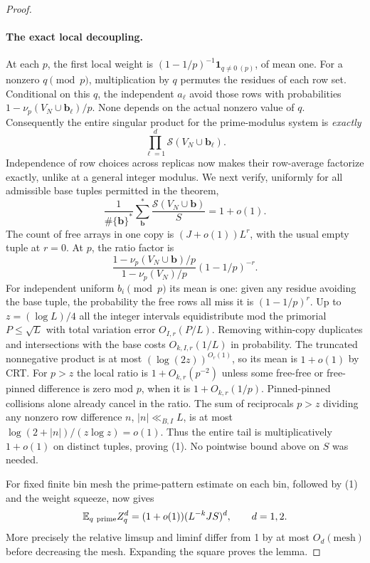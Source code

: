 \documentclass[11pt]{article}
\newcommand{\E}{\mathbb E}
\newcommand{\1}{\mathbf{1}}
\newcommand{\Sg}{\mathcal S}
\begin{document}
\begin{proof}
\paragraph{The exact local decoupling.}
At each $p$, the first local weight is $(1-1/p)^{-1}\1_{q\ne0\ (p)}$, of mean one. For a nonzero $q\pmod p$, multiplication by $q$ permutes the residues of each row set. Conditional on this $q$, the independent $a_\ell$ avoid those rows with probabilities $1-\nu_p(V_N\cup\mathbf b_\ell)/p$. None depends on the actual nonzero value of $q$. Consequently the entire singular product for the prime-modulus system is \emph{exactly}
\[
 \prod_{\ell=1}^d \Sg(V_N\cup\mathbf b_\ell).
\]
Independence of row choices across replicas now makes their row-average factorize exactly, unlike at a general integer modulus. We next verify, uniformly for all admissible base tuples permitted in the theorem,
\[
 \frac{1}{\#\{\mathbf b\}^{*}}\sum_{\mathbf b}^{*}
       \frac{\Sg(V_N\cup\mathbf b)}{S}=1+o(1).\tag{1}
\]
The count of free arrays in one copy is $(J+o(1))L^r$, with the usual empty tuple at $r=0$. At $p$, the ratio factor is
\[
 \frac{1-\nu_p(V_N\cup\mathbf b)/p}{1-\nu_p(V_N)/p}(1-1/p)^{-r}.
\]
For independent uniform $b_i\pmod p$ its mean is one: given any residue avoiding the base tuple, the probability the free rows all miss it is $(1-1/p)^r$. Up to $z=(\log L)/4$ all the integer intervals equidistribute mod the primorial $P\le\sqrt L$ with total variation error $O_{I,r}(P/L)$. Removing within-copy duplicates and intersections with the base costs $O_{k,I,r}(1/L)$ in probability. The truncated nonnegative product is at most $(\log(2z))^{O_r(1)}$, so its mean is $1+o(1)$ by CRT. For $p>z$ the local ratio is $1+O_{k,r}(p^{-2})$ unless some free-free or free-pinned difference is zero mod $p$, when it is $1+O_{k,r}(1/p)$. Pinned-pinned collisions alone already cancel in the ratio. The sum of reciprocals $p>z$ dividing any nonzero row difference $n$, $|n|\ll_{B,I} L$, is at most $\log(2+|n|)/(z\log z)=o(1)$. Thus the entire tail is multiplicatively $1+o(1)$ on distinct tuples, proving (1). No pointwise bound above on $S$ was needed.
\par For fixed finite bin mesh the prime-pattern estimate on each bin, followed by (1) and the weight squeeze, now gives
\[
 \E_{q\ {\rm prime}} Z_q^d=(1+o(1))(L^{-k}J S)^d,
 \qquad d=1,2 .
\]
More precisely the relative limsup and liminf differ from 1 by at most $O_d(\text{mesh})$ before decreasing the mesh. Expanding the square proves the lemma.
\end{proof}
\end{document}
